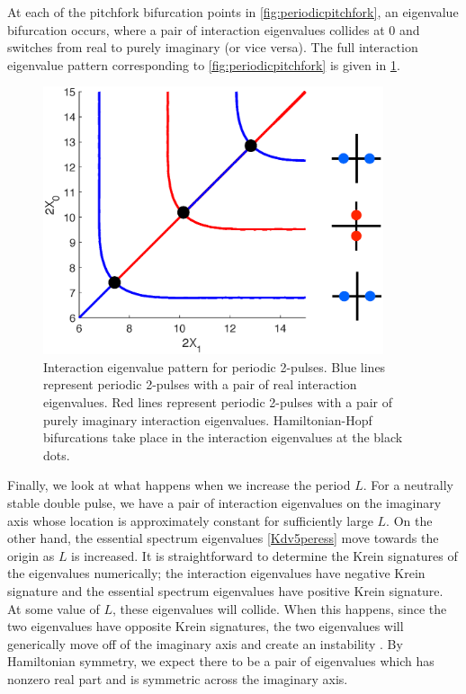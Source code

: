 \documentclass[thesis2.tex]{subfiles}
\begin{document}
At each of the pitchfork bifurcation points in \cref{fig:periodicpitchfork}, an eigenvalue bifurcation occurs, where a pair of interaction eigenvalues collides at 0 and switches from real to purely imaginary (or vice versa). The full interaction eigenvalue pattern corresponding to \cref{fig:periodicpitchfork} is given in \cref{fig:2periodiceigpattern}.

\begin{figure}
\includegraphics[width=10cm]{images/kdv5numerics/2periodiceigpattern.eps}
\caption[Interaction eigenvalue pattern for periodic double pulses in KdV5]{Interaction eigenvalue pattern for periodic 2-pulses. Blue lines represent periodic 2-pulses with a pair of real interaction eigenvalues. Red lines represent periodic 2-pulses with a pair of purely imaginary interaction eigenvalues. Hamiltonian-Hopf bifurcations take place in the interaction eigenvalues at the black dots.}
\label{fig:2periodiceigpattern}
\end{figure}

Finally, we look at what happens when we increase the period $L$. For a neutrally stable double pulse, we have a pair of interaction eigenvalues on the imaginary axis whose location is approximately constant for sufficiently large $L$. On the other hand, the essential spectrum eigenvalues \cref{Kdv5peress} move towards the origin as $L$ is increased. It is straightforward to determine the Krein signatures of the eigenvalues numerically; the interaction eigenvalues have negative Krein signature and the essential spectrum eigenvalues have positive Krein signature. At some value of $L$, these eigenvalues will collide. When this happens, since the two eigenvalues have opposite Krein signatures, the two eigenvalues will generically move off of the imaginary axis and create an instability \cite[Chapter 7.1]{Kapitula2013}. By Hamiltonian symmetry, we expect there to be a pair of eigenvalues which has nonzero real part and is symmetric across the imaginary axis.
\end{document}

